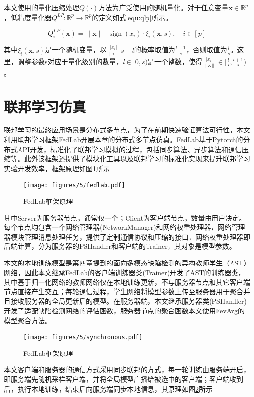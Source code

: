 本文使用的量化压缩处理$Q(\cdot)$方法为广泛使用的随机量化。\cite{reisizadehFedPAQCommunicationEfficientFederated2020}对于任意变量$\mathbf{x} \in \mathbb{R}^{p}$ ，低精度量化器$Q^{L P}: \mathbb{R}^{p} \rightarrow \mathbb{R}^{p}$的定义如式\ref{equ:qlp}所示。 

\begin{equation}\label{equ:qlp}
  Q_{i}^{L P}(\mathbf{x})=\|\mathbf{x}\| \cdot \operatorname{sign}\left(x_{i}\right) \cdot \xi_{i}(\mathbf{x}, s), \quad i \in[p]
\end{equation}


其中$\xi_{i}(\mathbf{x}, s)$是一个随机变量，以$\frac{\left|x_{i}\right|}{\|\mathbf{x}\|} s-l$的概率取值为$\frac{l+1}{s}$，否则取值为$\frac{l}{s}$。这里，调整参数s对应于量化级别的数量，$l \in[0, s)$是一个整数，使得$\frac{\left|x_{i}\right| }{ \|\mathbf{x}\|} \in[ \frac{l}{s} , \frac{ l+1 }{s})$。


\section{联邦学习仿真}
联邦学习的最终应用场景是分布式多节点，为了在前期快速验证算法可行性，本文利用联邦学习框架FedLab开展本章的分布式多节点仿真。FedLab基于Pytorch的分布式API开发，标准化了联邦学习模拟的过程，包括同步算法、异步算法和通信压缩等。\cite{zengFedLabFlexibleFederated2022}此外该框架还提供了模块化工具以及联邦学习的标准化实现来提升联邦学习实验开发效率，框架原理如图\ref{fig:fedlab-overview}所示
\begin{figure}[htbp]
  \centering
  \texttt{[image: figures/5/fedlab.pdf]}
  \caption{FedLab框架原理}\label{fig:fedlab-overview}
\end{figure}

其中Server为服务器节点，通常仅一个；Client为客户端节点，数量由用户决定。每个节点均包含一个网络管理器(NetworkManager)和网络权重处理器，网络管理器模块管理消息处理任务，提供了定制通信协议和压缩的接口，网络权重处理器即后端计算，分为服务器的PSHandler和客户端的Trainer，其对象是模型参数。

本文的本地训练模型是第四章提到的面向多模态缺陷检测的异构教师学生（AST）网络，因此本文继承FedLab的客户端训练器类(Trainer)开发了AST的训练器类，其中基于归一化网络的教师网络仅在本地训练更新，不与服务器节点和其它客户端节点直接产生交互；每轮通信过程，学生网络将模型参数上传至服务器用于聚合并且接收服务器的全局更新后的模型。在服务器端，本文继承服务器类(PSHandler)开发了适配缺陷检测网络的评估函数，服务器节点的聚合函数本文使用FevAvg的模型聚合方法。

\begin{figure}[htbp]
  \centering
  \texttt{[image: figures/5/synchronous.pdf]}
  \caption{FedLab框架原理}\label{fig:fedlab-synchronous}
\end{figure}
本文客户端和服务器的通信方式采用同步联邦的方式，每一轮训练由服务端开启，即服务端先随机采样客户端，并将全局模型广播给被选中的客户端；客户端收到后，执行本地训练，结束后向服务端同步本地信息，其原理如图\ref{fig:fedlab-synchronous}所示

